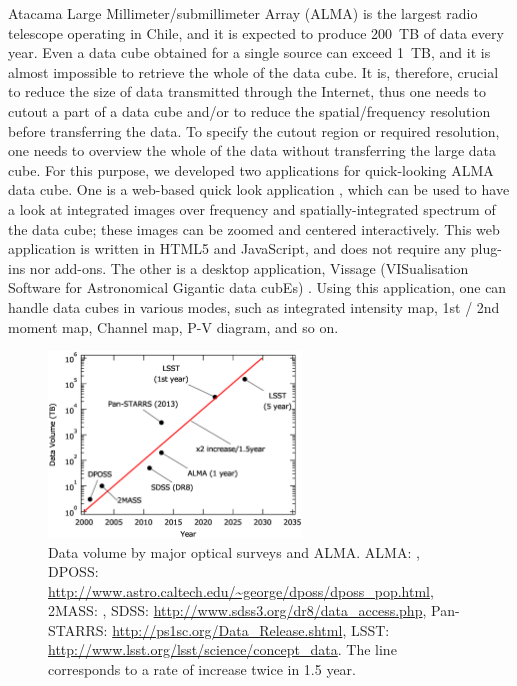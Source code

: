 Atacama Large Millimeter/submillimeter Array (ALMA) is the largest radio telescope operating in Chile, and it is expected to produce 200~TB of data every year. Even a data cube obtained for a single source can exceed 1~TB, and it is almost impossible to retrieve the whole of the data cube. It is, therefore, crucial to reduce the size of data transmitted through the Internet, thus one needs to cutout a part of a data cube and/or to reduce the spatial/frequency resolution before transferring the data. To specify the cutout region or required resolution, one needs to overview the whole of the data without transferring the large data cube. For this purpose, we developed two applications for quick-looking ALMA data cube. One is a web-based quick look application \citep{O10_adassxxii}, which can be used to have a look at integrated images over frequency and spatially-integrated spectrum of the data cube; these images can be zoomed and centered interactively. This web application is written in HTML5 and JavaScript, and does not require any plug-ins nor add-ons. The other is a desktop application, Vissage (VISualisation Software for Astronomical Gigantic data cubEs) \citep{P047_adassxxii}. Using this application, one can handle data cubes in various modes, such as integrated intensity map, 1st / 2nd moment map, Channel map, P-V diagram, and so on. 

\begin{figure}
\begin{center}
\includegraphics[width = 0.6\textwidth]{part11/Shirasaki_D5/D5_f1.eps}
\caption{Data volume by major optical surveys and ALMA.
ALMA: \citet{Lacy_2011},
DPOSS: \protect\url{http://www.astro.caltech.edu/~george/dposs/dposs_pop.html},
2MASS: \citet{Skrutskie_2006},
SDSS: \protect\url{http://www.sdss3.org/dr8/data_access.php},
Pan-STARRS: \protect\url{http://ps1sc.org/Data_Release.shtml},
LSST: \protect\url{http://www.lsst.org/lsst/science/concept_data}.
The line corresponds to a rate of increase twice in 1.5 year.
}
\label{Shfig:1}
\end{center}
\end{figure}

